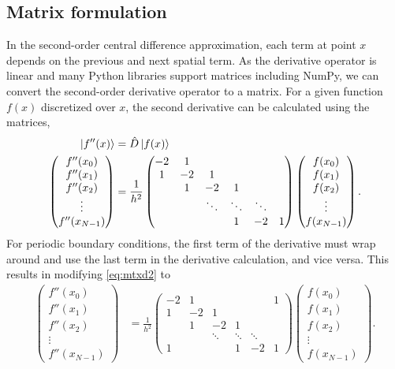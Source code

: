 \subsection{Matrix formulation}
In the second-order central difference approximation, each term at point $x$ depends on the previous and next spatial term. As the derivative operator is linear and many Python libraries support matrices including NumPy, we can convert the second-order derivative operator to a matrix. For a given function $f(x)$ discretized over $x$, the second derivative can be calculated using the matrices, \begin{align}
		\ket{f''(x)} & = \hat{D} \ket{f(x)} \notag \\
		\begin{pmatrix}
			f''(x_0) \\
			f''(x_1) \\
			f''(x_2) \\
			\vdots \\
			f''(x_{N-1})
		\end{pmatrix} & = \frac{1}{h^2}\begin{pmatrix}
			-2 & 1 & \\
			1 & -2 & 1 \\
			  & 1 & -2 & 1 \\
			  & & \ddots & \ddots & \ddots \\
			  & & & 1 & -2 & 1
	\end{pmatrix} \begin{pmatrix}
		f(x_0) \\
		f(x_1) \\
		f(x_2) \\
		\vdots \\
		f(x_{N-1})
	\end{pmatrix} \label{eq:mtxd2}.
	\end{align}
	For periodic boundary conditions, the first term of the derivative must wrap around and use the last term in the derivative calculation, and vice versa. This results in modifying \eqref{eq:mtxd2} to  \begin{align}
		\begin{pmatrix}
			f''(x_0) \\
			f''(x_1) \\
			f''(x_2) \\
			\vdots \\
			f''(x_{N-1})
		\end{pmatrix} & = \frac{1}{h^2}\begin{pmatrix}
			-2 & 1 & & & & 1\\
			1 & -2 & 1 \\
			& 1 & -2 & 1 \\
			& & \ddots & \ddots & \ddots \\
			1 & & & 1 & -2 & 1
		\end{pmatrix} \begin{pmatrix}
			f(x_0) \\
			f(x_1) \\
			f(x_2) \\
			\vdots \\
			f(x_{N-1})
		\end{pmatrix} \label{eq:mtxd2_periodic}.
	\end{align}
